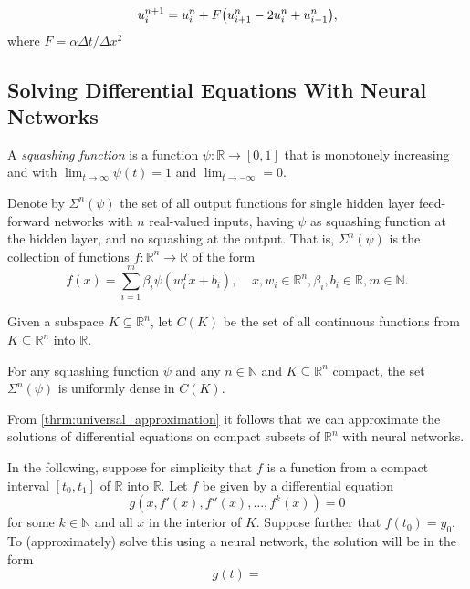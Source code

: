 \begin{equation}\label{eq:FE scheme}
    u_i^{n+1} = u_i^n + F \qty(u_{i+1}^n - 2u_i^n + u_{i-1}^n),
\end{equation}
where $F=\alpha \Delta t/\Delta x^2$

\subsection{Solving Differential Equations With Neural Networks}

\begin{definition}
A \emph{squashing function} is a function $\psi\colon\mathbb{R}\to[0,1]$ that is monotonely increasing and with $\lim_{t\to\infty}\psi(t)=1$ and $\lim_{t\to -\infty}=0$.
\end{definition}

Denote by $\Sigma^n(\psi)$ the set of all output functions for single hidden layer feed-forward networks with $n$ real-valued inputs, having $\psi$ as squashing function at the hidden layer, and no squashing at the output. That is, $\Sigma^n(\psi)$ is the collection of functions $f\colon\mathbb{R}^n\to\mathbb{R}$ of the form
\begin{equation*}
    f(x)=\sum_{i=1}^m\beta_i\psi(w^T_ix + b_i),\;\;\;\;x,w_i\in\mathbb{R}^n,\beta_i,b_i\in\mathbb{R},m\in\mathbb{N}.
\end{equation*}

Given a subspace $K\subseteq\mathbb{R}^n$, let $C(K)$ be the set of all continuous functions from $K\subseteq\mathbb{R}^n$ into $\mathbb{R}$.

\begin{theorem}\label{thrm:universal_approximation}
For any squashing function $\psi$ and any $n\in\mathbb{N}$ and $K\subseteq\mathbb{R}^n$ compact, the set $\Sigma^n(\psi)$ is uniformly dense in $C(K)$.
\end{theorem}

From \autoref{thrm:universal_approximation} it follows that we can approximate the solutions of differential equations on compact subsets of $\mathbb{R}^n$ with neural networks.

In the following, suppose for simplicity that $f$ is a function from a compact interval $[t_0,t_1]$ of $\mathbb{R}$ into $\mathbb{R}$. Let $f$ be given by a differential equation
\begin{equation*}
    g(x,f'(x),f''(x),\ldots,f^{k}(x)) = 0
\end{equation*}
for some $k\in\mathbb{N}$ and all $x$ in the interior of $K$. Suppose further that $f(t_0)=y_0$. To (approximately) solve this using a neural network, the solution will be in the form
\begin{equation*}
    g(t) = 
\end{equation*}

